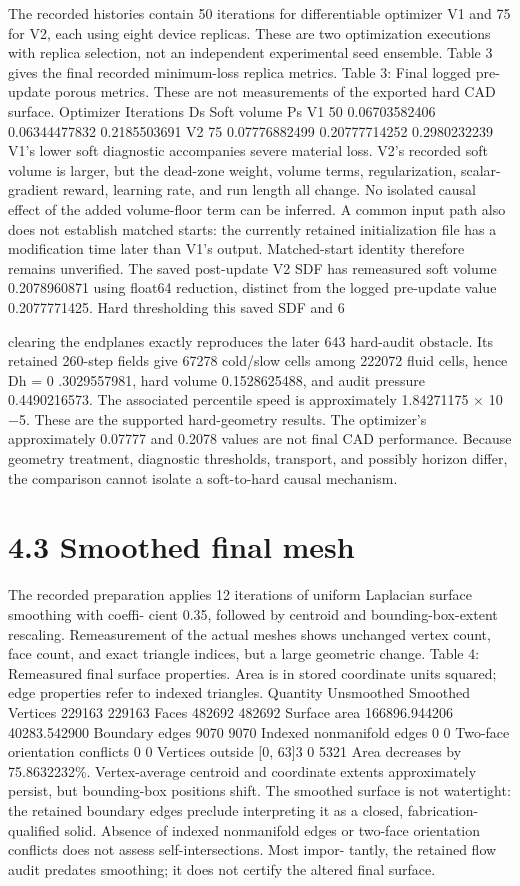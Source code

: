 \documentclass[11pt]{article}
\begin{document}
The recorded histories contain 50 iterations for differentiable optimizer V1 and 75 for V2, each
using eight device replicas. These are two optimization executions with replica selection, not an
independent experimental seed ensemble. Table 3 gives the final recorded minimum-loss replica
metrics.
Table 3: Final logged pre-update porous metrics. These are not measurements of the exported
hard CAD surface.
Optimizer Iterations Ds Soft volume Ps
V1 50 0.06703582406 0.06344477832 0.2185503691
V2 75 0.07776882499 0.20777714252 0.2980232239
V1’s lower soft diagnostic accompanies severe material loss. V2’s recorded soft volume is larger,
but the dead-zone weight, volume terms, regularization, scalar-gradient reward, learning rate, and
run length all change. No isolated causal effect of the added volume-floor term can be inferred. A
common input path also does not establish matched starts: the currently retained initialization file
has a modification time later than V1’s output. Matched-start identity therefore remains unverified.
The saved post-update V2 SDF has remeasured soft volume 0.2078960871 using float64 reduction,
distinct from the logged pre-update value 0.2077771425. Hard thresholding this saved SDF and
6

clearing the endplanes exactly reproduces the later 643 hard-audit obstacle. Its retained 260-step
fields give 67278 cold/slow cells among 222072 fluid cells, hence Dh = 0 .3029557981, hard volume
0.1528625488, and audit pressure 0.4490216573. The associated percentile speed is approximately
1.84271175 \ensuremath{\times} 10\ensuremath{-}5. These are the supported hard-geometry results. The optimizer’s approximately
0.07777 and 0.2078 values are not final CAD performance. Because geometry treatment, diagnostic
thresholds, transport, and possibly horizon differ, the comparison cannot isolate a soft-to-hard
causal mechanism.

\section*{4.3 Smoothed final mesh}

The recorded preparation applies 12 iterations of uniform Laplacian surface smoothing with coeffi-
cient 0.35, followed by centroid and bounding-box-extent rescaling. Remeasurement of the actual
meshes shows unchanged vertex count, face count, and exact triangle indices, but a large geometric
change.
Table 4: Remeasured final surface properties. Area is in stored coordinate units squared; edge
properties refer to indexed triangles.
Quantity Unsmoothed Smoothed
Vertices 229163 229163
Faces 482692 482692
Surface area 166896.944206 40283.542900
Boundary edges 9070 9070
Indexed nonmanifold edges 0 0
Two-face orientation conflicts 0 0
Vertices outside [0, 63]3 0 5321
Area decreases by 75.8632232\%. Vertex-average centroid and coordinate extents approximately
persist, but bounding-box positions shift. The smoothed surface is not watertight: the retained
boundary edges preclude interpreting it as a closed, fabrication-qualified solid. Absence of indexed
nonmanifold edges or two-face orientation conflicts does not assess self-intersections. Most impor-
tantly, the retained flow audit predates smoothing; it does not certify the altered final surface.
\end{document}

